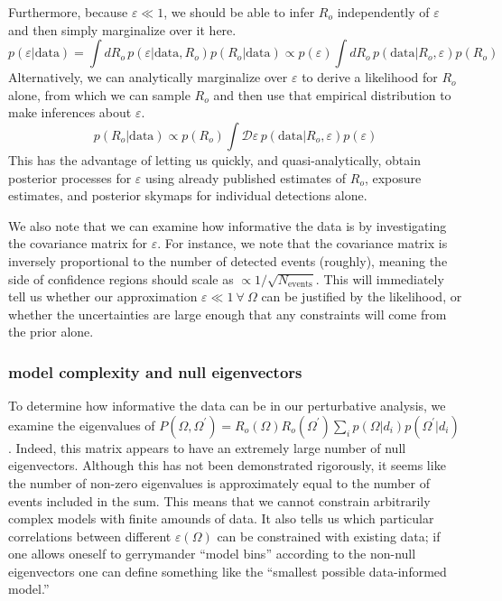 \documentclass{article}
\begin{document}
Furthermore, because $\varepsilon\ll1$, we should be able to infer $R_o$ independently of $\varepsilon$ and then simply marginalize over it here.
\begin{equation}
    p(\varepsilon|\mathrm{data}) = \int dR_o\, p(\varepsilon|\mathrm{data},R_o)p(R_o|\mathrm{data}) \propto p(\varepsilon) \int dR_o\, p(\mathrm{data}|R_o, \varepsilon)p(R_o)
\end{equation}
Alternatively, we can analytically marginalize over $\varepsilon$ to derive a likelihood for $R_o$ alone, from which we can sample $R_o$ and then use that empirical distribution to make inferences about $\varepsilon$.
\begin{equation}
    p(R_o|\mathrm{data}) \propto p(R_o) \int \mathcal{D}\varepsilon\, p(\mathrm{data}|R_o, \varepsilon)p(\varepsilon)
\end{equation}
This has the advantage of letting us quickly, and quasi-analytically, obtain posterior processes for $\varepsilon$ using already published estimates of $R_o$, exposure estimates, and posterior skymaps for individual detections alone. 

We also note that we can examine how informative the data is by investigating the covariance matrix for $\varepsilon$.
For instance, we note that the covariance matrix is inversely proportional to the number of detected events (roughly), meaning the side of confidence regions should scale as $\propto 1/\sqrt{N_\mathrm{events}}$.
This will immediately tell us whether our approximation $\varepsilon\ll1\ \forall\ \Omega$ can be justified by the likelihood, or whether the uncertainties are large enough that any constraints will come from the prior alone.

\subsubsection*{model complexity and null eigenvectors}

To determine how informative the data can be in our perturbative analysis, we examine the eigenvalues of $P(\Omega, \Omega^\prime) = R_o(\Omega) R_o(\Omega^\prime) \sum\limits_i p(\Omega|d_i) p(\Omega^\prime|d_i)$.
Indeed, this matrix appears to have an extremely large number of null eigenvectors. 
Although this has not been demonstrated rigorously, it seems like the number of non-zero eigenvalues is approximately equal to the number of events included in the sum.
This means that we cannot constrain arbitrarily complex models with finite amounds of data.
It also tells us which particular correlations between different $\varepsilon(\Omega)$ can be constrained with existing data; if one allows oneself to gerrymander ``model bins'' according to the non-null eigenvectors one can define something like the ``smallest possible data-informed model.''
\end{document}
